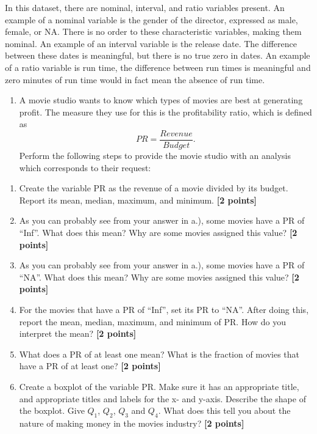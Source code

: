\documentclass[
]{article}
\providecommand{\tightlist}{%
  \setlength{\itemsep}{0pt}\setlength{\parskip}{0pt}}
\begin{document}
In this dataset, there are nominal, interval, and ratio variables
present. An example of a nominal variable is the gender of the director,
expressed as male, female, or NA. There is no order to these
characteristic variables, making them nominal. An example of an interval
variable is the release date. The difference between these dates is
meaningful, but there is no true zero in dates. An example of a ratio
variable is run time, the difference between run times is meaningful and
zero minutes of run time would in fact mean the absence of run time.

\begin{enumerate}
\def\labelenumi{\arabic{enumi}.}
\setcounter{enumi}{2}
\tightlist
\item
  A movie studio wants to know which types of movies are best at
  generating profit. The measure they use for this is the profitability
  ratio, which is defined as \[PR=\frac{Revenue}{Budget}.\] Perform the
  following steps to provide the movie studio with an analysis which
  corresponds to their request:
\end{enumerate}

\begin{enumerate}
\def\labelenumi{\alph{enumi}.}
\tightlist
\item
  Create the variable PR as the revenue of a movie divided by its
  budget. Report its mean, median, maximum, and minimum.
  \textbf{[2 points]}
\item
  As you can probably see from your answer in a.), some movies have a PR
  of ``Inf''. What does this mean? Why are some movies assigned this
  value? \textbf{[2 points]}
\item
  As you can probably see from your answer in a.), some movies have a PR
  of ``NA''. What does this mean? Why are some movies assigned this
  value? \textbf{[2 points]}
\item
  For the movies that have a PR of ``Inf'', set its PR to ``NA''. After
  doing this, report the mean, median, maximum, and minimum of PR. How
  do you interpret the mean? \textbf{[2 points]}
\item
  What does a PR of at least one mean? What is the fraction of movies
  that have a PR of at least one? \textbf{[2 points]}
\item
  Create a boxplot of the variable PR. Make sure it has an appropriate
  title, and appropriate titles and labels for the x- and y-axis.
  Describe the shape of the boxplot. Give \(Q_1\), \(Q_2\), \(Q_3\) and
  \(Q_4\). What does this tell you about the nature of making money in
  the movies industry? \textbf{[2 points]}
\end{enumerate}
\end{document}

